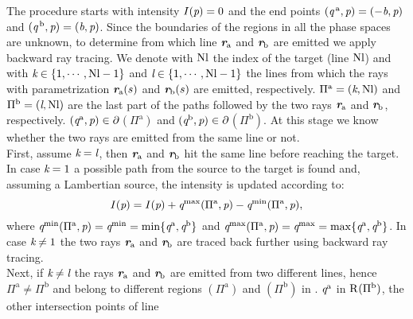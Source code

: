 The procedure starts with intensity $I(\textit{p})=0$ and the end points $(\textit{q}^{\,\textrm{a}}, \textit{p})= (-\textit{b}, \textit{p})$ and $(\textit{q}^{\,\textrm{b}}, \textit{p}) = (\textit{b}, \textit{p})$. Since the boundaries of the regions in all the phase spaces are unknown, to determine from which line $\textit{\textbf{r}}_{\textrm{a}}$ and $\textit{\textbf{r}}_{\textrm{b}}$ are emitted we apply backward ray tracing. We denote with $\textrm{Nl}$ the index of the target (line $\textrm{Nl}$) and with $\textit{k}\in\{1,\cdots, \textrm{Nl}-1\}$ and $\textit{l}\in\{1,\cdots, \textrm{Nl}-1\}$ the lines from which the rays with parametrization $\textit{\textbf{r}}_{\textrm{a}}(s)$ and $\textit{\textbf{r}}_{\textrm{b}}(s)$ are emitted, respectively. $\Pi^\textrm{a} = (\textit{k}, \textrm{Nl})$ and $\Pi^\textrm{b} = (\textit{l},\textrm{Nl})$ are the last part of the paths followed by the two rays $\textit{\textbf{r}}_{\textrm{a}}$ and $\textit{\textbf{r}}_{\textrm{b}}$, respectively. $(\textit{q}^{\textrm{a}}, \textit{p})\in\partial$$(\Pi^{\textrm{a}})$ and $(\textit{q}^{\textrm{b}}, \textit{p})\in\partial$$(\Pi^{\textrm{b}})$. At this stage we know whether the two rays are emitted from the same line or not. \\ \indent 
First, assume $\textit{k}= \textit{l}$, then $\textit{\textbf{r}}_{\textrm{a}}$ and $\textit{\textbf{r}}_{\textrm{b}}$ hit the same line before reaching the target. 
In case $\textit{k} = 1$ a possible path from the source to the target is found and, assuming a Lambertian source, the intensity is updated according to:
\begin{equation}\label{eq:intensity_brm}
I(\textit{p}) = I(\textit{p})+\textit{q}^{\textrm{max}}(\Pi^\textrm{a}, \textit{p})-\textit{q}^{\textrm{min}}(\Pi^\textrm{a}, \textit{p}),
\end{equation}
where $\textit{q}^{\textrm{min}}(\Pi^\textrm{a}, \textit{p}) = \textit{q}^{\textrm{min}} = \min\{\textit{q}^{\textrm{a}}, \textit{q}^{\textrm{b}}\}$ and $\textit{q}^{\textrm{max}}(\Pi^\textrm{a}, \textit{p}) = \textit{q}^{\textrm{max}} = \max\{\textit{q}^{\textrm{a}}, \textit{q}^{\textrm{b}}\}$. In case $\textit{k}\neq 1$ the two rays $\textit{\textbf{r}}_{\textrm{a}}$ and $\textit{\textbf{r}}_{\textrm{b}}$ are traced back further using backward ray tracing.
\\ \indent Next, if $\textit{k}\neq \textit{l}$ the rays $\textit{\textbf{r}}_\textrm{a}$ and $\textit{\textbf{r}}_\textrm{b}$ are emitted from two different lines, hence $\Pi^{\textrm{a}}\neq \Pi^{\textrm{b}}$ and belong to different regions $(\Pi^{\textrm{a}})$ and $(\Pi^{\textrm{b}})$ in . $\textit{q}^{\textrm{a}}$ in $\mbox{$\textup{R}_{\textit{}}$}(\Pi^{\textrm{b}})$, the other intersection points of line 
